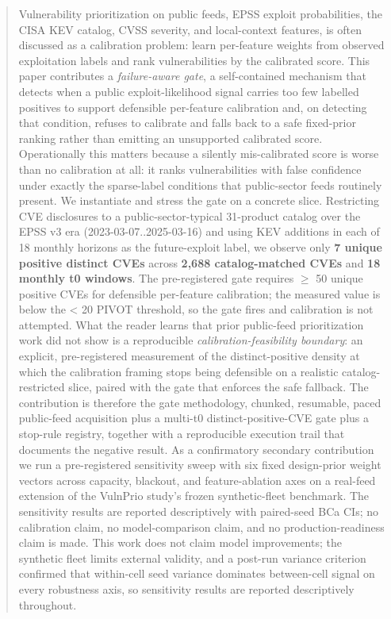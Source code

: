 \begin{abstract}
Vulnerability prioritization on public feeds, EPSS exploit probabilities, the CISA KEV catalog, CVSS severity, and local-context features, is often discussed as a calibration problem: learn per-feature weights from observed exploitation labels and rank vulnerabilities by the calibrated score. This paper contributes a \emph{failure-aware gate}, a self-contained mechanism that detects when a public exploit-likelihood signal carries too few labelled positives to support defensible per-feature calibration and, on detecting that condition, refuses to calibrate and falls back to a safe fixed-prior ranking rather than emitting an unsupported calibrated score. Operationally this matters because a silently mis-calibrated score is worse than no calibration at all: it ranks vulnerabilities with false confidence under exactly the sparse-label conditions that public-sector feeds routinely present. We instantiate and stress the gate on a concrete slice. Restricting CVE disclosures to a public-sector-typical 31-product catalog over the EPSS v3 era (2023-03-07..2025-03-16) and using KEV additions in each of 18 monthly horizons as the future-exploit label, we observe only \textbf{7 unique positive distinct CVEs} across \textbf{2,688 catalog-matched CVEs} and \textbf{18 monthly t0 windows}. The pre-registered gate requires $\geq$ 50 unique positive CVEs for defensible per-feature calibration; the measured value is below the < 20 PIVOT threshold, so the gate fires and calibration is not attempted. What the reader learns that prior public-feed prioritization work did not show is a reproducible \emph{calibration-feasibility boundary}: an explicit, pre-registered measurement of the distinct-positive density at which the calibration framing stops being defensible on a realistic catalog-restricted slice, paired with the gate that enforces the safe fallback. The contribution is therefore the gate methodology, chunked, resumable, paced public-feed acquisition plus a multi-t0 distinct-positive-CVE gate plus a stop-rule registry, together with a reproducible execution trail that documents the negative result. As a confirmatory secondary contribution we run a pre-registered sensitivity sweep with six fixed design-prior weight vectors across capacity, blackout, and feature-ablation axes on a real-feed extension of the VulnPrio study's frozen synthetic-fleet benchmark. The sensitivity results are reported descriptively with paired-seed BCa CIs; no calibration claim, no model-comparison claim, and no production-readiness claim is made. This work does not claim model improvements; the synthetic fleet limits external validity, and a post-run variance criterion confirmed that within-cell seed variance dominates between-cell signal on every robustness axis, so sensitivity results are reported descriptively throughout.
\end{abstract}
